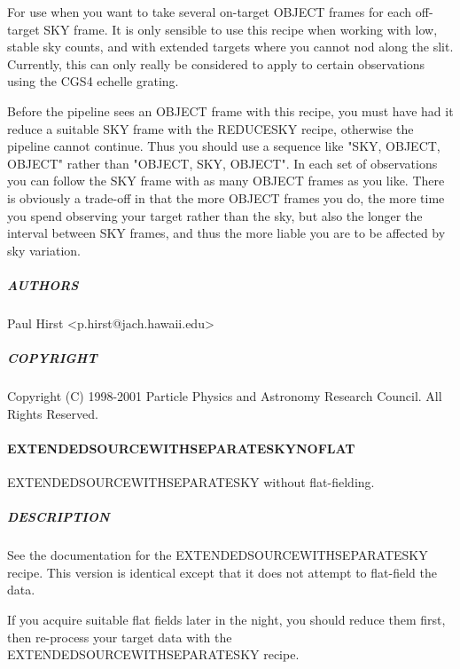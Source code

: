 \documentclass[twoside,11pt]{article}
\renewcommand{\_}{\texttt{\symbol{95}}}
\begin{document}
For use when you want to take several on-target OBJECT frames for each
off-target SKY frame. It is only sensible to use this recipe when
working with low, stable sky counts, and with extended targets where
you cannot nod along the slit. Currently, this can only really be
considered to apply to certain observations using the CGS4 echelle
grating.



Before the pipeline sees an OBJECT frame with this recipe, you must
have had it reduce a suitable SKY frame with the REDUCE\_SKY recipe,
otherwise the pipeline cannot continue. Thus you should use a sequence
like "SKY, OBJECT, OBJECT" rather than "OBJECT, SKY, OBJECT". In each
set of observations you can follow the SKY frame with as many OBJECT
frames as you like. There is obviously a trade-off in that the more
OBJECT frames you do, the more time you spend observing your target
rather than the sky, but also the longer the interval between SKY
frames, and thus the more liable you are to be affected by sky
variation.

\subparagraph*{AUTHORS\label{EXTENDED_SOURCE_WITH_SEPARATE_SKY_AUTHORS}}

Paul Hirst <p.hirst@jach.hawaii.edu>

\subparagraph*{COPYRIGHT\label{EXTENDED_SOURCE_WITH_SEPARATE_SKY_COPYRIGHT}}

Copyright (C) 1998-2001 Particle Physics and Astronomy Research
Council. All Rights Reserved.

\paragraph*{EXTENDED\_SOURCE\_WITH\_SEPARATE\_SKY\_NOFLAT\label{EXTENDED_SOURCE_WITH_SEPARATE_SKY_NOFLAT}}

EXTENDED\_SOURCE\_WITH\_SEPARATE\_SKY without flat-fielding.

\subparagraph*{DESCRIPTION\label{EXTENDED_SOURCE_WITH_SEPARATE_SKY_NOFLAT_DESCRIPTION}}

See the documentation for the EXTENDED\_SOURCE\_WITH\_SEPARATE\_SKY
recipe. This version is identical except that it does not attempt to
flat-field the data.



If you acquire suitable flat fields later in the night, you should
reduce them first, then re-process your target data with the
EXTENDED\_SOURCE\_WITH\_SEPARATE\_SKY recipe.
\end{document}
